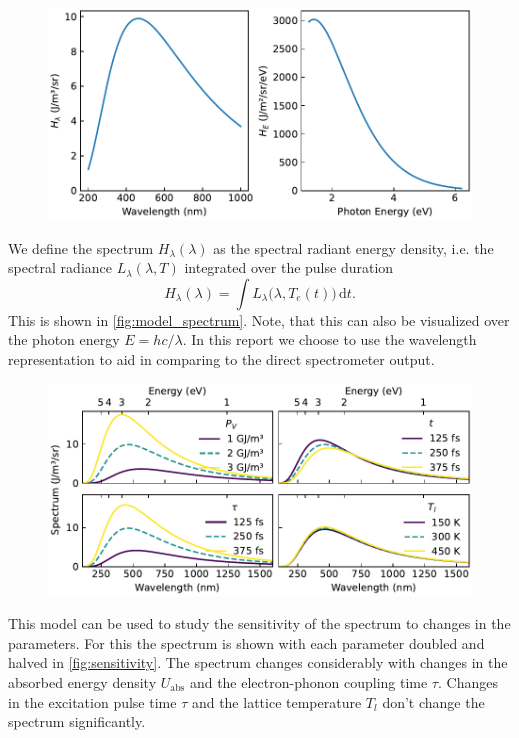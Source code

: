 \documentclass[
	a4paper,
]{scrarticle}
\begin{document}
\begin{figure}
    \centering
    \includegraphics{../analysis/figures/model.spectrum.pdf}
    \caption{}
    \label{fig:model_spectrum}
\end{figure}

We define the spectrum $H_\lambda(\lambda)$ as the spectral radiant energy density, i.e. the spectral radiance $L_\lambda(\lambda, T)$ integrated over the pulse duration
\begin{equation}
      H_\lambda(\lambda) = 
      \int L_\lambda\bigl(\lambda, T_e(t)\bigr)\,\mathrm dt.
\end{equation}
This is shown in \autoref{fig:model_spectrum}.
Note, that this can also be visualized over the photon energy $E = h c / \lambda$. In this report we choose to use the wavelength representation to aid in comparing to the direct spectrometer output.


\begin{figure}
    \centering
    \includegraphics{../analysis/figures/sensitivity.pdf}
    \caption{}
    \label{fig:sensitivity}
\end{figure}
This model can be used to study the sensitivity of the spectrum to changes in the parameters. For this the spectrum is shown with each parameter doubled and halved in \autoref{fig:sensitivity}.
The spectrum changes considerably with changes in the absorbed energy density $U_\text{abs}$ and the electron-phonon coupling time $\tau$. Changes in the excitation pulse time $\tau$ and the lattice temperature $T_l$ don't change the spectrum significantly.
\end{document}
